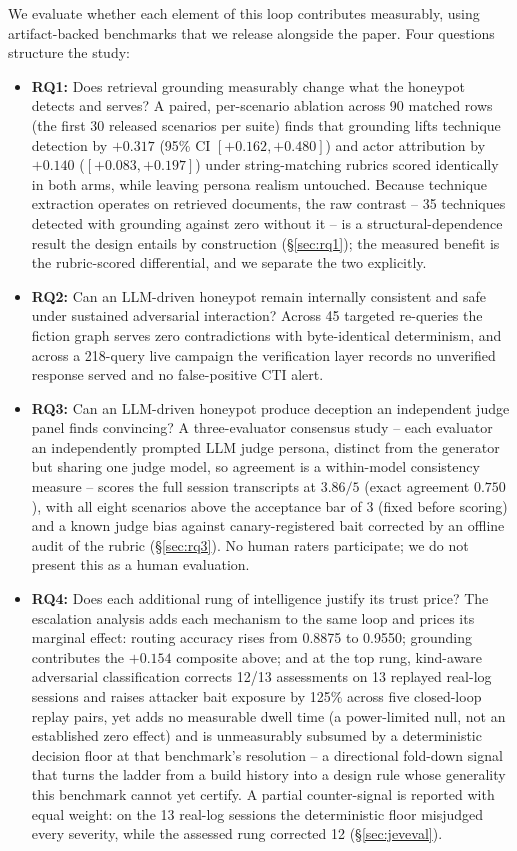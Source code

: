 We evaluate whether each element of this loop contributes measurably,
using
artifact-backed benchmarks that we release alongside the paper. Four
questions structure the study:
\begin{itemize}
\item \textbf{RQ1:} Does retrieval grounding measurably change what the
honeypot detects and serves? A paired, per-scenario ablation across 90
matched rows (the first 30 released scenarios per suite) finds that
grounding lifts technique detection by $+0.317$ (95\% CI $[+0.162,
+0.480]$) and actor attribution by $+0.140$ ($[+0.083, +0.197]$) under
string-matching rubrics scored identically in both arms, while leaving
persona realism untouched. Because technique extraction operates on
retrieved documents, the raw contrast -- 35 techniques detected with
grounding against zero without it -- is a structural-dependence result
the design entails by construction (\S\ref{sec:rq1}); the measured
benefit is the rubric-scored differential, and we separate the two
explicitly.
\item \textbf{RQ2:} Can an LLM-driven honeypot remain internally consistent
and safe under sustained adversarial interaction? Across 45 targeted
re-queries the fiction graph serves zero contradictions with byte-identical
determinism, and across a 218-query live campaign the verification layer
records no unverified response served and no false-positive CTI alert.
\item \textbf{RQ3:} Can an LLM-driven honeypot produce deception an
independent judge panel finds convincing? A three-evaluator consensus
study -- each evaluator an independently prompted LLM judge persona,
distinct from the generator but sharing one judge model, so agreement is
a within-model consistency measure -- scores the full session
transcripts at $3.86/5$ (exact agreement $0.750$), with all eight
scenarios above the acceptance bar of 3 (fixed before scoring) and a
known judge bias against canary-registered bait corrected by an offline
audit of the rubric (\S\ref{sec:rq3}). No human raters participate; we
do not present this as a human evaluation.
\item \textbf{RQ4:} Does each additional rung of intelligence justify its
trust price? The escalation analysis adds each mechanism to the same
loop and prices its marginal effect: routing accuracy rises from 0.8875
to 0.9550; grounding contributes the $+0.154$ composite above; and at
the top rung, kind-aware adversarial classification corrects 12/13
assessments on 13 replayed real-log sessions and raises attacker bait
exposure by 125\% across five closed-loop replay pairs, yet adds no
measurable dwell time (a power-limited null, not an established zero
effect) and is unmeasurably subsumed by a deterministic decision floor
at that benchmark's resolution -- a directional fold-down signal that
turns the ladder from a build history into a design rule whose
generality this benchmark cannot yet certify. A partial counter-signal
is reported with equal weight: on the 13 real-log sessions the
deterministic floor misjudged every severity, while the assessed rung
corrected 12 (\S\ref{sec:jeveval}).
\end{itemize}


